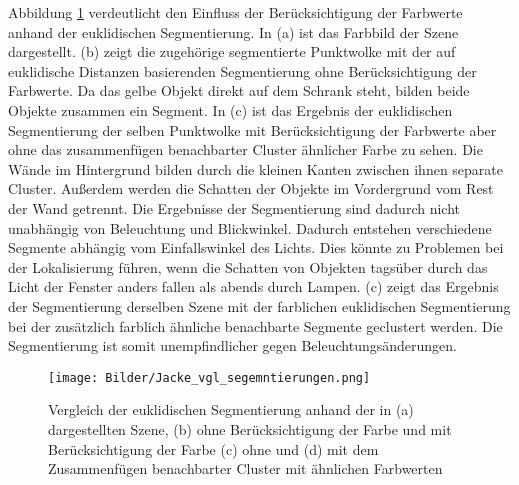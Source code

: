 Abbildung \ref{fig:RegionMerging} verdeutlicht den Einfluss der Berücksichtigung der Farbwerte anhand der euklidischen Segmentierung.  In (a) ist das Farbbild der Szene dargestellt. (b) zeigt die zugehörige segmentierte Punktwolke mit der auf euklidische Distanzen basierenden Segmentierung ohne Berücksichtigung der Farbwerte. Da das gelbe Objekt direkt auf dem Schrank steht, bilden beide Objekte zusammen ein Segment. In (c) ist das Ergebnis der euklidischen Segmentierung der selben Punktwolke mit Berücksichtigung der Farbwerte aber ohne das zusammenfügen benachbarter Cluster ähnlicher Farbe zu sehen. Die Wände im Hintergrund bilden durch die kleinen Kanten zwischen ihnen separate Cluster. Außerdem werden die Schatten der Objekte im Vordergrund vom Rest der Wand getrennt. Die Ergebnisse der Segmentierung sind dadurch nicht unabhängig von Beleuchtung und Blickwinkel. Dadurch entstehen verschiedene Segmente abhängig vom Einfallswinkel des Lichts. Dies könnte zu Problemen bei der Lokalisierung führen, wenn die Schatten von Objekten tagsüber durch das Licht der Fenster anders fallen als abends durch Lampen. (c) zeigt das Ergebnis der Segmentierung derselben Szene mit der farblichen euklidischen Segmentierung bei der zusätzlich farblich ähnliche benachbarte Segmente geclustert werden. Die Segmentierung ist somit unempfindlicher gegen Beleuchtungsänderungen.

 
\begin{figure}
	\centering
	\texttt{[image: Bilder/Jacke\_vgl\_segemntierungen.png]}
	\caption{Vergleich der euklidischen Segmentierung anhand der in (a) dargestellten Szene, (b) ohne Berücksichtigung der Farbe und mit Berücksichtigung der Farbe (c) ohne und (d) mit dem Zusammenfügen benachbarter Cluster mit ähnlichen Farbwerten}
	\label{fig:RegionMerging}
\end{figure}

